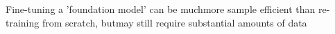\documentclass[preview]{standalone}
\begin{document}
\begin{center}
Fine-tuning a 'foundation model' can be muchmore sample efficient than 
re-training from scratch, butmay still require substantial amounts of data
\end{center}
\end{document}
